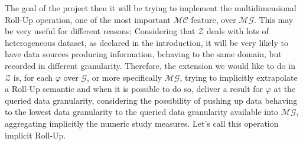 \documentclass[12pt,a4paper]{report}
\newcommand\systemModel{\mathcal{Z}}
\newcommand\globalQuery{\varphi}
\newcommand\targetGraph{\mathcal{G}}
\newcommand\multidimensionalCube{\mathcal{MC}}
\newcommand\fact{\mathcal{F}}
\newcommand\multidimensionalGraph{\mathcal{MG}}
\begin{document}
The goal of the project then it will be trying to implement the multidimensional Roll-Up operation, one of the most important $\multidimensionalCube$ feature, over $\multidimensionalGraph$.
%
This may be very useful for different reasons;
%
%
Considering that $\systemModel$ deals with lots of heterogeneous dataset, as declared in the introduction, it will be very likely to have data sources producing information, behaving to the same domain, but recorded in different granularity.
%
Therefore, the extension we would like to do in $\systemModel$ is, for each $\globalQuery$ over $\targetGraph$, or more specifically $\multidimensionalGraph$, trying to implicitly extrapolate a Roll-Up semantic and when it is possible to do so, deliver a result for $\globalQuery$ at the queried data granularity, considering the possibility of pushing up data behaving to the lowest data granularity to the queried data granularity available into $\multidimensionalGraph$, aggregating implicitly the numeric study measures.
%
Let's call this operation implicit Roll-Up.
\end{document}
